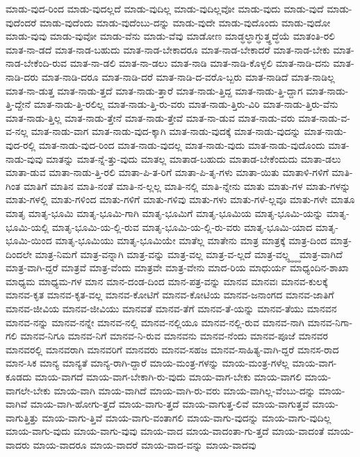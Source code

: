 {ಮಾಡು-ವುದ-ರಿಂದ
ಮಾಡು-ವುದಲ್ಲದೆ
ಮಾಡು-ವುದಿಲ್ಲ
ಮಾಡು-ವುದಿಲ್ಲವೋ
ಮಾಡು-ವುದು
ಮಾಡು-ವುದೆ
ಮಾಡು-ವುದೆಂದರೆ
ಮಾಡು-ವುದೆಂದು
ಮಾಡು-ವುದೆಂಬು-ದನ್ನು
ಮಾಡು-ವುದೇ
ಮಾಡು-ವುದೊಂದು
ಮಾಡು-ವುದೋ
ಮಾಡು-ವುವು
ಮಾಡು-ವುವೋ
ಮಾಡು-ವೆನು
ಮಾಡು-ವೆವು
ಮಾಡೋಣ
ಮಾಡ್ಧಲ್ಧಾಗ್ಧುತ್ತ್ಧದ್ಧೆಯೆ
ಮಾತಂತಿ-ರಲಿ
ಮಾತ-ನಾ-ಡದೆ
ಮಾತ-ನಾಡ-ಬಹುದು
ಮಾತ-ನಾಡ-ಬೇಕಾದರೂ
ಮಾತ-ನಾಡ-ಬೇಕಾದರೆ
ಮಾತ-ನಾಡ-ಬೇಕು
ಮಾತ-ನಾಡ-ಬೇಕೆಂದಿ-ರುವ
ಮಾತ-ನಾ-ಡಲಿ
ಮಾತ-ನಾ-ಡಲು
ಮಾತ-ನಾಡಿ
ಮಾತ-ನಾಡಿ-ಕೊಳ್ಳಲಿ
ಮಾತ-ನಾಡಿ-ದನು
ಮಾತ-ನಾಡಿ-ದರು
ಮಾತ-ನಾಡಿ-ದರೂ
ಮಾತ-ನಾಡಿ-ದರೆ
ಮಾತ-ನಾಡಿ-ದ-ವರೊ-ಬ್ಬರು
ಮಾತ-ನಾಡಿದೆ
ಮಾತ-ನಾಡಿಲ್ಲ
ಮಾತ-ನಾ-ಡುತ್ತ
ಮಾತ-ನಾಡು-ತ್ತದೆ
ಮಾತ-ನಾಡು-ತ್ತಾರೆ
ಮಾತ-ನಾಡು-ತ್ತಿದ್ದ
ಮಾತ-ನಾಡು-ತ್ತಿ-ದ್ದಾಗ
ಮಾತ-ನಾಡು-ತ್ತಿ-ದ್ದೇನೆ
ಮಾತ-ನಾಡು-ತ್ತಿ-ರಲಿಲ್ಲ
ಮಾತ-ನಾಡು-ತ್ತಿ-ರು-ವರು
ಮಾತ-ನಾಡು-ತ್ತಿರು-ವಿರಿ
ಮಾತ-ನಾಡು-ತ್ತಿರು-ವೆನು
ಮಾತ-ನಾಡು-ತ್ತಿಲ್ಲ
ಮಾತ-ನಾಡು-ತ್ತೇನೆ
ಮಾತ-ನಾಡು-ತ್ತೇವೆ
ಮಾತ-ನಾ-ಡುವ
ಮಾತ-ನಾಡು-ವರು
ಮಾತ-ನಾಡು-ವ-ವ-ನಲ್ಲ
ಮಾತ-ನಾಡು-ವಾಗ
ಮಾತ-ನಾಡು-ವುದ-ಕ್ಕಾಗಿ
ಮಾತ-ನಾಡು-ವುದಕ್ಕೆ
ಮಾತ-ನಾಡು-ವುದನ್ನು
ಮಾತ-ನಾಡು-ವುದ-ರಲ್ಲಿ
ಮಾತ-ನಾಡು-ವುದ-ರಿಂದ
ಮಾತ-ನಾಡು-ವುದಲ್ಲ
ಮಾತ-ನಾಡು-ವುದು
ಮಾತ-ನಾಡು-ವುದೊಂದು
ಮಾತ-ನಾಡು-ವುವು
ಮಾತನ್ನು
ಮಾತ-ನ್ನೆ-ತ್ತು-ವುದು
ಮಾತಲ್ಲ
ಮಾತಾಡ-ಬಹುದು
ಮಾತಾಡ-ಬೇಕೆಂದುದು
ಮಾತಾ-ಡಲು
ಮಾತಾ-ಡುವ
ಮಾತಾ-ನಾಡು-ತ್ತಿ-ರಲಿ
ಮಾತಾ-ಪಿ-ತ-ರಿಗೆ
ಮಾತಾ-ಪಿ-ತೃ-ಗಳು
ಮಾತಾ-ಯಿತು
ಮಾತಾಳಿ-ಗಳಿಗೆ
ಮಾತಿ-ಗಿಂತ
ಮಾತಿಗೆ
ಮಾತಿನ
ಮಾತಿ-ನಂತೆ
ಮಾತಿ-ನ-ಲ್ಲಲ್ಲ
ಮಾತಿ-ನಲ್ಲಿ
ಮಾತಿ-ನ್ನೇನು
ಮಾತು
ಮಾತು-ಗಳ
ಮಾತು-ಗಳನ್ನು
ಮಾತು-ಗಳಲ್ಲಿ
ಮಾತು-ಗಳಿಂದ
ಮಾತು-ಗಳಿಗೆ
ಮಾತು-ಗಳಿವು
ಮಾತು-ಗಳು
ಮಾತು-ಗಳೆ-ಲ್ಲವೂ
ಮಾತು-ಗಳೇ
ಮಾತೂ
ಮಾತೃ
ಮಾತೃ-ಭೂಮಿ
ಮಾತೃ-ಭೂಮಿ-ಗಾಗಿ
ಮಾತೃ-ಭೂಮಿಗೆ
ಮಾತೃ-ಭೂಮಿಯ
ಮಾತೃ-ಭೂಮಿ-ಯನ್ನು
ಮಾತೃ-ಭೂಮಿ-ಯಲ್ಲಿ
ಮಾತೃ-ಭೂಮಿ-ಯ-ಲ್ಲಿ-ರುವ
ಮಾತೃ-ಭೂಮಿ-ಯ-ಲ್ಲಿ-ರು-ವರು
ಮಾತೃ-ಭೂಮಿ-ಯಾದ
ಮಾತೃ-ಭೂಮಿ-ಯಿಂದ
ಮಾತೃ-ಭೂಮಿಯು
ಮಾತೃ-ಭೂಮಿಯೇ
ಮಾತೆಲ್ಲ
ಮಾತೇನು
ಮಾತ್ರ
ಮಾತ್ರಕ್ಕೆ
ಮಾತ್ರ-ದಿಂದ
ಮಾತ್ರ-ದಿಂದಲೇ
ಮಾತ್ರ-ನಿಮಗೆ
ಮಾತ್ರ-ವನ್ನಾಗಿ
ಮಾತ್ರ-ವನ್ನು
ಮಾತ್ರ-ವಲ್ಲ
ಮಾತ್ರ-ವ-ಲ್ಲದೆ
ಮಾತ್ರ-ವಲ್ಲ್ಧ್ಧ್ಧ್ಧ
ಮಾತ್ರ-ವಾಗಿದೆ
ಮಾತ್ರ-ವಾಗಿ-ದ್ದರೆ
ಮಾತ್ರವೆ
ಮಾತ್ರ-ವೆಂದು
ಮಾತ್ರವೇ
ಮಾತ್ರ-ವೇನು
ಮಾದ-ರಿಯ
ಮಾಧುರ್ಯ
ಮಾಧ್ಯಂದಿನ-ಶಾಖಾ
ಮಾಧ್ಯಮ
ಮಾಧ್ಯಮ-ಗಳ
ಮಾನ
ಮಾನ-ದಂಡ-ದಿಂದ
ಮಾನ-ಪತ್ರ-ವನ್ನು
ಮಾನವ
ಮಾನವಃ
ಮಾನವ-ಕುಲಕ್ಕೆ
ಮಾನವ-ಕೃತ
ಮಾನವ-ಕೃತ-ವಲ್ಲ
ಮಾನವ-ಕೋಟಿಗೆ
ಮಾನವ-ಕೋಟಿಯ
ಮಾನವ-ಜನಾಂಗದ
ಮಾನವ-ಜಾತಿಗೆ
ಮಾನವ-ಜೀವಿಯ
ಮಾನವ-ಜೀವಿಯು
ಮಾನವತೆ
ಮಾನವ-ತೆಗೆ
ಮಾನವ-ತೆ-ಯನ್ನು
ಮಾನವ-ತೆಯು
ಮಾನವನ
ಮಾನವ-ನನ್ನು
ಮಾನವ-ನನ್ನೇ
ಮಾನವ-ನಲ್ಲಿ
ಮಾನವ-ನಲ್ಲಿಯೂ
ಮಾನವ-ನಲ್ಲಿ-ರುವ
ಮಾನವ-ನಾಗಿ
ಮಾನವ-ನಿಗಾ-ಗಲಿ
ಮಾನವ-ನಿಗೂ
ಮಾನವ-ನಿಗೆ
ಮಾನವ-ನಿ-ರುವ
ಮಾನವನು
ಮಾನವ-ನೆಂದು
ಮಾನವ-ಪೂಜೆ
ಮಾನವರ
ಮಾನವರಲ್ಲಿ
ಮಾನವರಾಗಿ
ಮಾನವರಿಗೆ
ಮಾನವರು
ಮಾನವ-ಸಹಜ
ಮಾನವ-ಸಾಹಿತ್ಯ-ವಾಗಿ-ದ್ದರೆ
ಮಾನಸ-ರಾದ
ಮಾನ-ಸಿಕ
ಮಾನ್ಯ
ಮಾನ್ಯತೆ
ಮಾನ್ಯ-ರಾಗಿ-ದ್ದಾರೆ
ಮಾಯ-ಮಂತ್ರ-ಗಳನ್ನು
ಮಾಯ-ಮಂತ್ರ-ಗಳೆಲ್ಲ
ಮಾಯ-ವಾಗ-ಕೂಡದು
ಮಾಯ-ವಾಗದೆ
ಮಾಯ-ವಾಗ-ಬೇಕಾಗಿ-ರು-ವುದು
ಮಾಯ-ವಾಗ-ಬೇಕು
ಮಾಯ-ವಾಗಲಿ
ಮಾಯ-ವಾಗಲೇ-ಬೇಕು
ಮಾಯ-ವಾಗಿ
ಮಾಯ-ವಾಗಿದೆ
ಮಾಯ-ವಾಗಿ-ರು-ವರು
ಮಾಯ-ವಾಗಿಲ್ಲ-ವೆಂಬು-ದನ್ನು
ಮಾಯ-ವಾಗಿವೆ
ಮಾಯ-ವಾಗಿ-ಹೋಗು-ತ್ತದೆ
ಮಾಯ-ವಾಗು-ತ್ತದೆ
ಮಾಯ-ವಾಗುತ್ತ-ಲಿವೆ
ಮಾಯ-ವಾಗುತ್ತವೆ
ಮಾಯ-ವಾಗುತ್ತಿತ್ತು
ಮಾಯ-ವಾಗು-ತ್ತಿವೆ
ಮಾಯ-ವಾಗು-ವಂತಾಗಲಿ
ಮಾಯ-ವಾಗು-ವುದನ್ನು
ಮಾಯ-ವಾಗು-ವುದಿಲ್ಲ
ಮಾಯ-ವಾಗು-ವುದು
ಮಾಯ-ವಾಗು-ವುವು
ಮಾಯ-ವಾದ
ಮಾಯ-ವಾದಂತಾ-ಗು-ತ್ತದೆ
ಮಾಯ-ವಾದಂತೆ
ಮಾಯ-ವಾದರು
ಮಾಯ-ವಾದರೂ
ಮಾಯ-ವಾದರೆ
ಮಾಯ-ವಾದ-ವನ್ನು
ಮಾಯ-ವಾದವು
}
